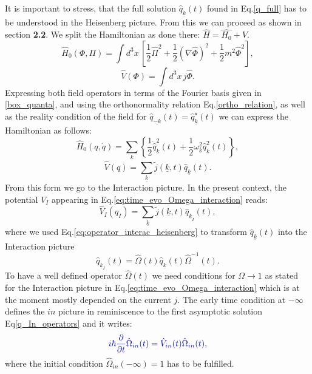 \documentclass[12pt, titlepage]{article}
\begin{document}
It is important to stress, that the full solution $  \hat{q}_{\underline{k}}(t) 
 $ found in Eq.\enskip\eqref{q_full} has to be understood in the Heisenberg picture.
 From this we can proceed as shown in section \textbf{2.2}.  
We split the Hamiltonian as done there: $ \hat{H}= \hat{H_0} +V $. 
\begin{equation}
\hat{H}_{0}({\Phi},{\Pi})=
\int d^{3}x 
\,
\left[ 
\frac{1}{2}\hat{\Pi}^{2} + \frac{1}{2}(\nabla \hat{ \Phi})^{2} 
+\frac{1}{2}m^{2}\hat{\Phi}^{2}
\right] 
,
\end{equation}
\begin{equation}
\hat{V}(\Phi)=
\int d^{3}x 
\,
j\hat{\Phi}
.
\end{equation}
Expressing both field operators in terms of the Fourier basis given in \eqref{box_quanta}, and using the orthonormality relation Eq.\enskip\eqref{ortho_relation}, as well as the reality condition of the field for $ \hat{q}_{\underline{-k}}(t)=\hat{q}^{\star}_{\underline{k}}(t) $ we can express the Hamiltonian as follows:
\begin{equation}
\hat{H}_{0}({q},\dot{{q}})=
\sum_{\underline{k}}
\left\lbrace 
\frac{1}{2}\dot{\hat{q}}^{2}_{\underline{k}}(t)
+\frac{1}{2}\omega_{\underline{k}}^{2}\hat{q}^{2}_{\underline{k}}(t)
\right\rbrace 
,
\end{equation}
\begin{equation}
\hat{V}(q)=
\sum_{\underline{k}}
\tilde{j}(\underline{k},t)\hat{q}_{\underline{k}}(t).
\end{equation}
From this form we go to the Interaction picture. In the present context, the potential $ V_{I} $ appearing in Eq.\enskip\eqref{eq:time_evo_Omega_interaction} reads:
\begin{equation}
\hat{V}_{I}(q_{I})=
\sum_{\underline{k}}
\tilde{j}(\underline{k},t)\hat{q}_{\underline{k}_{I}}(t),
\end{equation}
where we used Eq.\enskip\eqref{eq:operator_interac_heisenberg} to transform $ \hat{q}_{\underline{k}}(t) $ into the Interaction picture
\begin{equation}
\hat{q}_{\underline{k}_{I}}(t)=
\hat{\Omega}(t)
\hat{q}_{\underline{k}}(t)
\hat{\Omega}^{-1}(t).
\end{equation}
To have a well defined operator $ \hat{\Omega}(t) $  we need conditions for $ \Omega \rightarrow 1 $ as stated for the Interaction picture in Eq.\enskip\eqref{eq:time_evo_Omega_interaction} which is at the moment mostly depended on the current $ j $.
%
%
%
%
The early time condition at $ -\infty $ defines the $ in $ picture in reminiscence to the first asymptotic solution Eq\enskip\eqref{q_In_operators} and it  writes:
\begin{equation}\label{eq:time_evo_Omega_in}
\textcolor[RGB]{0,0,204}{
	i\hbar
	\frac{\partial}{\partial t}
	\hat{\Omega}_{in}(t)
=
	\hat{V}_{in}(t)
	\hat{\Omega}_{in}(t)
	,
	}
	\end{equation}
 where the initial condition $	\hat{\Omega}_{in}(-\infty)=1$ has to be fulfilled.
  
\end{document}
